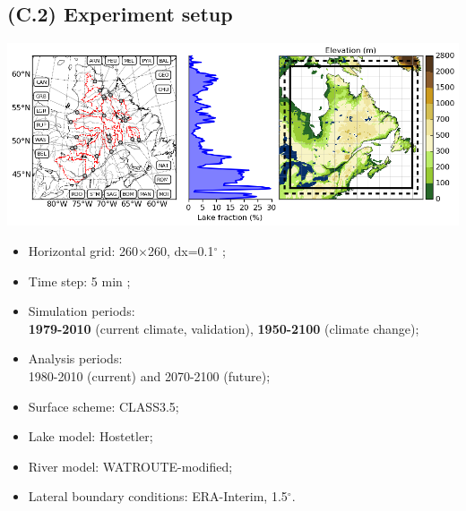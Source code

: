 \documentclass[a0,landscape]{a0poster}
\begin{document}
\begin{multicols*}{3}
\subsection*{(C.2) Experiment setup}
  \begin{minipage}[b]{0.5\linewidth}
    \center
    \includegraphics[width=\linewidth]{qc_basin_outlets_points}
  \end{minipage} \hfill
%
\begin{minipage}[b]{0.45\linewidth}
\flushleft
\begin{itemize}
  \item Horizontal grid: 260$\times$260, \color{Red} dx=0.1$^\circ$ \color{DarkSlateGray};
  \item Time step: \color{Red} 5 min \color{DarkSlateGray};
  \item Simulation periods:\\ \textbf{1979-2010} (current climate, validation), \textbf{1950-2100} (climate change);
  \item Analysis periods:\\ 1980-2010 (current) and 2070-2100 (future);
  \item Surface scheme: CLASS3.5;
  \item Lake model: Hostetler;
  \item River model: WATROUTE-modified;
  \item Lateral boundary conditions: ERA-Interim, 1.5$^\circ$.
\end{itemize}
\end{minipage}



\end{multicols*}
\end{document}

